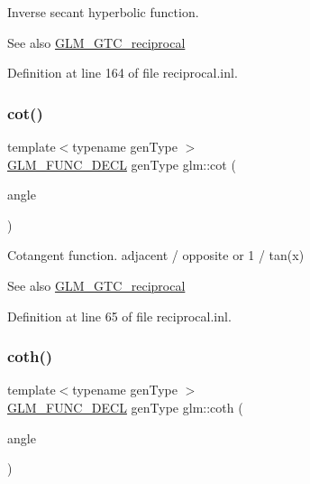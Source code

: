 Inverse secant hyperbolic function.

\begin{DoxySeeAlso}{See also}
\hyperlink{group__gtc__reciprocal}{G\+L\+M\+\_\+\+G\+T\+C\+\_\+reciprocal} 
\end{DoxySeeAlso}


Definition at line 164 of file reciprocal.\+inl.

\mbox{\label{group__gtc__reciprocal_ga2f49e28c2634ae1a212e2fc38c42ad42}} 
\subsubsection{\texorpdfstring{cot()}{cot()}}
{\footnotesize\ttfamily template$<$typename gen\+Type $>$ \\
\hyperlink{setup_8hpp_ab2d052de21a70539923e9bcbf6e83a51}{G\+L\+M\+\_\+\+F\+U\+N\+C\+\_\+\+D\+E\+CL} gen\+Type glm\+::cot (\begin{DoxyParamCaption}\item[{gen\+Type const \&}]{angle }\end{DoxyParamCaption})}

Cotangent function. adjacent / opposite or 1 / tan(x)

\begin{DoxySeeAlso}{See also}
\hyperlink{group__gtc__reciprocal}{G\+L\+M\+\_\+\+G\+T\+C\+\_\+reciprocal} 
\end{DoxySeeAlso}


Definition at line 65 of file reciprocal.\+inl.

\mbox{\label{group__gtc__reciprocal_gae2f1e6f7c360dda452b88e0c492d6f4d}} 
\subsubsection{\texorpdfstring{coth()}{coth()}}
{\footnotesize\ttfamily template$<$typename gen\+Type $>$ \\
\hyperlink{setup_8hpp_ab2d052de21a70539923e9bcbf6e83a51}{G\+L\+M\+\_\+\+F\+U\+N\+C\+\_\+\+D\+E\+CL} gen\+Type glm\+::coth (\begin{DoxyParamCaption}\item[{gen\+Type const \&}]{angle }\end{DoxyParamCaption})}

